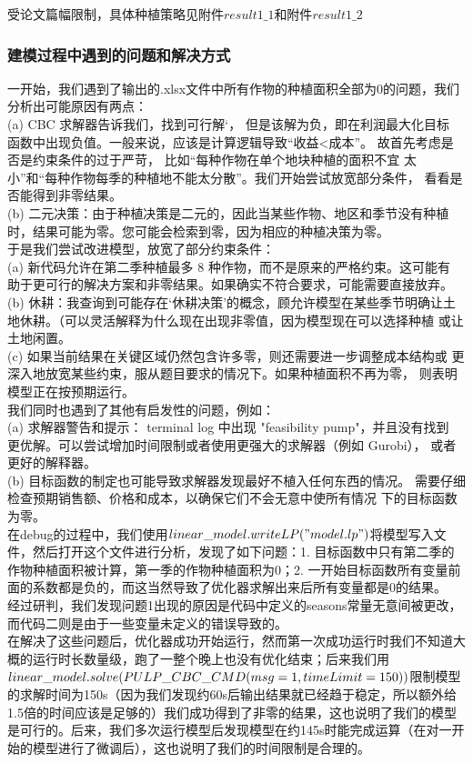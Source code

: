 \documentclass[withoutpreface]{cumcmthesis}
\begin{document}
受论文篇幅限制，具体种植策略见附件$result1\_1$和附件$result1\_2$

\subsubsection{建模过程中遇到的问题和解决方式}
一开始，我们遇到了输出的.xlsx文件中所有作物的种植面积全部为0的问题，我们分析出可能原因有两点：\\
(a) CBC 求解器告诉我们，找到可行解‘， 但是该解为负，即在利润最大化目标
函数中出现负值。一般来说，应该是计算逻辑导致“收益<成本”。 故首先考虑是否是约束条件的过于严苛， 比如“每种作物在单个地块种植的面积不宜
太小”和“每种作物每季的种植地不能太分散”。我们开始尝试放宽部分条件，
看看是否能得到非零结果。\\
(b) 二元决策：由于种植决策是二元的，因此当某些作物、地区和季节没有种植
时，结果可能为零。您可能会检索到零，因为相应的种植决策为零。\\

于是我们尝试改进模型，放宽了部分约束条件：\\
(a) 新代码允许在第二季种植最多 8 种作物，而不是原来的严格约束。这可能有
助于更可行的解决方案和非零结果。如果确实不符合要求，可能需要直接放弃。 \\
(b) 休耕：我查询到可能存在‘休耕决策’的概念，顾允许模型在某些季节明确让土
地休耕。（可以灵活解释为什么现在出现非零值，因为模型现在可以选择种植
或让土地闲置。 \\
(c) 如果当前结果在关键区域仍然包含许多零，则还需要进一步调整成本结构或
更深入地放宽某些约束，服从题目要求的情况下。如果种植面积不再为零，
则表明模型正在按预期运行。 \\

我们同时也遇到了其他有启发性的问题，例如：\\
(a) 求解器警告和提示： terminal log 中出现 "feasibility pump"，并且没有找到
更优解。可以尝试增加时间限制或者使用更强大的求解器（例如 Gurobi），
或者更好的解释器。 \\
(b) 目标函数的制定也可能导致求解器发现最好不植入任何东西的情况。
需要仔细检查预期销售额、价格和成本，以确保它们不会无意中使所有情况
下的目标函数为零。 \\

在debug的过程中，我们使用$ linear\_model.writeLP("model.lp") $将模型写入文件，然后打开这个文件进行分析，发现了如下问题：1. 目标函数中只有第二季的作物种植面积被计算，第一季的作物种植面积为0；2. 一开始目标函数所有变量前面的系数都是负的，而这当然导致了优化器求解出来后所有变量都是0的结果。\\
经过研判，我们发现问题1出现的原因是代码中定义的seasons常量无意间被更改，而代码二则是由于一些变量未定义的错误导致的。\\
在解决了这些问题后，优化器成功开始运行，然而第一次成功运行时我们不知道大概的运行时长数量级，跑了一整个晚上也没有优化结束；后来我们用 $ linear\_model.solve(PU\\LP\_CBC\_CMD(msg=1, timeLimit=150)) $限制模型的求解时间为150s（因为我们发现约60s后输出结果就已经趋于稳定，所以额外给1.5倍的时间应该是足够的）我们成功得到了非零的结果，这也说明了我们的模型是可行的。后来，我们多次运行模型后发现模型在约145s时能完成运算（在对一开始的模型进行了微调后），这也说明了我们的时间限制是合理的。
\end{document}
